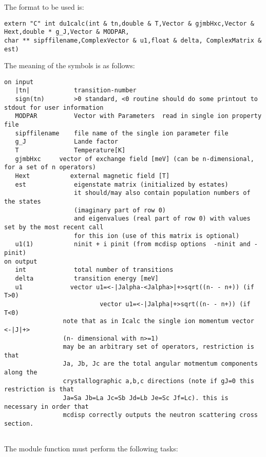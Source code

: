 The format to be used is:
{\footnotesize
\begin{verbatim}
extern "C" int du1calc(int & tn,double & T,Vector & gjmbHxc,Vector & Hext,double * g_J,Vector & MODPAR,
char ** sipffilename,ComplexVector & u1,float & delta, ComplexMatrix & est)
\end{verbatim}

The meaning of the symbols is as follows:

\begin{verbatim}
on input
   |tn|            transition-number  
   sign(tn)        >0 standard, <0 routine should do some printout to stdout for user information
   MODPAR          Vector with Parameters  read in single ion property file
   sipffilename    file name of the single ion parameter file
   g_J             Lande factor
   T               Temperature[K]
   gjmbHxc     vector of exchange field [meV] (can be n-dimensional, for a set of n operators)
   Hext           external magnetic field [T]
   est             eigenstate matrix (initialized by estates)
                   it should/may also contain population numbers of the states
				   (imaginary part of row 0)
                   and eigenvalues (real part of row 0) with values set by the most recent call
				   for this ion (use of this matrix is optional)
   u1(1)           ninit + i pinit (from mcdisp options  -ninit and -pinit)
on output
   int             total number of transitions
   delta           transition energy [meV]
   u1             vector u1=<-|Jalpha-<Jalpha>|+>sqrt((n- - n+)) (if T>0)
                          vector u1=<-|Jalpha|+>sqrt((n- - n+)) (if T<0)
                note that as in Icalc the single ion momentum vector <-|J|+> 
				(n- dimensional with n>=1)
                may be an arbitrary set of operators, restriction is that 
                Ja, Jb, Jc are the total angular motmentum components along the
                crystallographic a,b,c directions (note if gJ=0 this restriction is that
                Ja=Sa Jb=La Jc=Sb Jd=Lb Je=Sc Jf=Lc). this is necessary in order that
                mcdisp correctly outputs the neutron scattering cross section.
				
\end{verbatim}
}
The module function must perform the following tasks:
